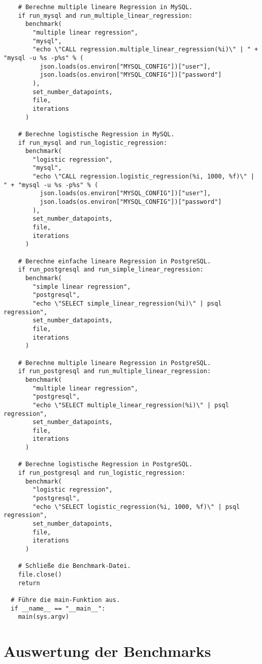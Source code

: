\begin{verbatim}
    # Berechne multiple lineare Regression in MySQL.
    if run_mysql and run_multiple_linear_regression:
      benchmark(
        "multiple linear regression",
        "mysql",
        "echo \"CALL regression.multiple_linear_regression(%i)\" | " + "mysql -u %s -p%s" % (
          json.loads(os.environ["MYSQL_CONFIG"])["user"],
          json.loads(os.environ["MYSQL_CONFIG"])["password"]
        ),
        set_number_datapoints,
        file,
        iterations
      )

    # Berechne logistische Regression in MySQL.
    if run_mysql and run_logistic_regression:
      benchmark(
        "logistic regression",
        "mysql",
        "echo \"CALL regression.logistic_regression(%i, 1000, %f)\" | " + "mysql -u %s -p%s" % (
          json.loads(os.environ["MYSQL_CONFIG"])["user"],
          json.loads(os.environ["MYSQL_CONFIG"])["password"]
        ),
        set_number_datapoints,
        file,
        iterations
      )

    # Berechne einfache lineare Regression in PostgreSQL.
    if run_postgresql and run_simple_linear_regression:
      benchmark(
        "simple linear regression",
        "postgresql",
        "echo \"SELECT simple_linear_regression(%i)\" | psql regression",
        set_number_datapoints,
        file,
        iterations
      )

    # Berechne multiple lineare Regression in PostgreSQL.
    if run_postgresql and run_multiple_linear_regression:
      benchmark(
        "multiple linear regression",
        "postgresql",
        "echo \"SELECT multiple_linear_regression(%i)\" | psql regression",
        set_number_datapoints,
        file,
        iterations
      )

    # Berechne logistische Regression in PostgreSQL.
    if run_postgresql and run_logistic_regression:
      benchmark(
        "logistic regression",
        "postgresql",
        "echo \"SELECT logistic_regression(%i, 1000, %f)\" | psql regression",
        set_number_datapoints,
        file,
        iterations
      )

    # Schließe die Benchmark-Datei.
    file.close()
    return

  # Führe die main-Funktion aus.
  if __name__ == "__main__":
    main(sys.argv)
\end{verbatim}

\section{Auswertung der Benchmarks}
\label{appendix:F:2}

